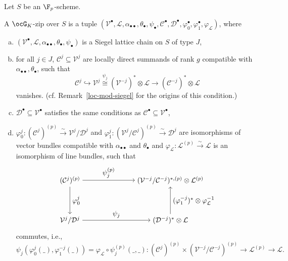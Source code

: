 \documentclass[a4paper]{scrartcl} %
\numberwithin{equation}{section}
\begin{document}
\begin{Definition}\label{def-siegel-zip}
  Let $S$ be an $\F_p$-scheme.

  A $\ocG_K$-zip over $S$ is a tuple $(\mathcal{V}^\bullet,\mathcal{L},\alpha_{\bullet\bullet},\theta_\bullet,\psi_\bullet,\mathcal{C}^\bullet,\mathcal{D}^\bullet,\varphi_{0}^{\bullet},\varphi_{1}^{\bullet},\varphi_{\mathcal{L}})$, where
  \begin{enumerate}[(a)]
  \item $(\mathcal{V}^\bullet,\mathcal{L},\alpha_{\bullet\bullet},\theta_\bullet,\psi_\bullet)$ is a Siegel lattice chain on $S$ of type $J$,
  \item for all $j\in J$, $\mathcal{C}^j\subseteq\mathcal{V}^j$ are locally direct summands of rank $g$ compatible with $\alpha_{\bullet\bullet},\theta_\bullet$, such that
    \begin{equation*}
      \mathcal{C}^j \hookrightarrow \mathcal{V}^j \overset{\psi_j}\cong (\mathcal{V}^{-j})^*\otimes\mathcal{L} \to (\mathcal{C}^{-j})^*\otimes\mathcal{L}
    \end{equation*}
    vanishes. (cf. Remark~\ref{loc-mod-siegel} for the origins of this condition.)
  \item $\mathcal{D}^\bullet\subseteq\mathcal{V}^\bullet$ satisfies the same conditions as $\mathcal{C}^\bullet\subseteq \mathcal{V}^\bullet$,
  \item $\varphi_{0}^{j}\colon (\mathcal{C}^j)^{(p)} \xrightarrow{\sim} \mathcal{V}^j/\mathcal{D}^j$ and $\varphi_{1}^{j}\colon (\mathcal{V}^j/\mathcal{C}^j)^{(p)} \xrightarrow{\sim} \mathcal{D}^j$ are isomorphisms of vector bundles compatible with $\alpha_{\bullet\bullet}$ and $\theta_\bullet$ and $\varphi_\mathcal{L}\colon \mathcal{L}^{(p)}\xrightarrow{\sim}\mathcal{L}$ is an isomorphism of line bundles, such that
    \begin{equation*}
      \begin{tikzpicture}[node distance=4cm, auto]
        \node (X) at (0,2) {$(\mathcal{C}^j)^{(p)}$};
        \node (Z) at (5,2) {$(\mathcal{V}^{-j}/\mathcal{C}^{-j})^{*,(p)}\otimes \mathcal{L}^{(p)}$};
        \node (Zs) at (5,0) {$(\mathcal{D}^{-j})^*\otimes \mathcal{L}$};
        \node (Xs) at (0,0) {$\mathcal{V}^j/\mathcal{D}^j$};
        
        \draw[->] (X) to node {$\varphi_{0}^{j}$} (Xs);
        \draw[<-] (Z) to  node {$(\varphi_{1}^{-j})^*\otimes\varphi_\mathcal{L}^{-1}$}  (Zs);
        \draw[->] (X) to node {$\psi_j^{(p)}$} (Z);
        \draw[->] (Xs) to  node{$\psi_j$}  (Zs);
      \end{tikzpicture}
    \end{equation*}
    commutes, i.e.,
    \begin{equation*}
      {\psi_j(\varphi_{0}^{j}(\_),\varphi_{1}^{-j}(\_)) = \varphi_\mathcal{L}\circ\psi_j^{(p)}(\_,\_)\colon}{(\mathcal{C}^j)^{(p)}\times (\mathcal{V}^{-j}/\mathcal{C}^{-j})^{(p)}\to \mathcal{L}^{(p)}\to \mathcal{L}}.
    \end{equation*}
  \end{enumerate}


\end{Definition}
\end{document}
